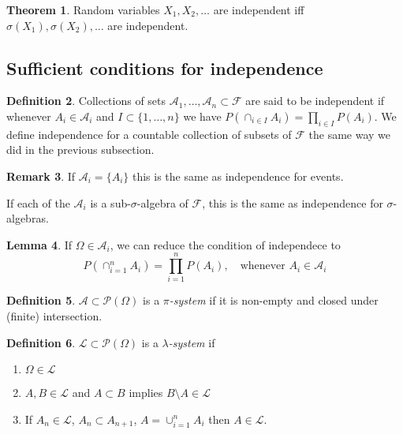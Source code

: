 \documentclass{article}
\theoremstyle{definition}
\newtheorem{theorem}{Theorem}[section]
\newtheorem{lemma}[theorem]{Lemma}
\newtheorem{definition}[theorem]{Definition}
\newtheorem{remark}[theorem]{Remark}
\begin{document}
\begin{theorem}
    Random variables $X_1, X_2, \dots$ are independent iff $\sigma(X_1), \sigma(X_2), \dots$ are independent.
\end{theorem}

\subsection{Sufficient conditions for independence}

\begin{definition}

    Collections of sets $\mathcal{A}_1, \dots, \mathcal{A}_n \subset \mathcal{F}$ are said to be independent if whenever $A_i \in \mathcal{A}_i$ and $I \subset \{1, \dots, n\}$ we have $P(\cap_{i \in I} A_i) = \prod_{i \in I} P(A_i)$. We define independence for a countable collection of subsets of $\mathcal{F}$ the same way we did in the previous subsection.
\end{definition}

\begin{remark}
    If $\mathcal{A}_i = \{A_i\}$ this is the same as independence for events.

    If each of the $\mathcal{A}_i$ is a sub-$\sigma$-algebra of $\mathcal{F}$, this is the same as independence for $\sigma$-algebras.
\end{remark}

\begin{lemma}
    If $\Omega \in \mathcal{A}_i$, we can reduce the condition of independece to
    $$ P(\cap_{i=1}^n A_i) = \prod\limits_{i=1}^n P(A_i), \quad \text{whenever } A_i \in \mathcal{A}_i$$
\end{lemma}

\begin{definition}
    $\mathcal{A} \subset \mathcal{P}(\Omega)$ is a $\pi$\emph{-system} if it is non-empty and closed under (finite) intersection.
\end{definition}

\begin{definition}
    $\mathcal{L} \subset \mathcal{P}(\Omega)$ is a $\lambda$\emph{-system} if
    \begin{enumerate}
        \item $\Omega \in \mathcal{L}$
        \item $A, B \in \mathcal{L}$ and $A \subset B$ implies $B \setminus A \in \mathcal{L}$
        \item If $A_n \in \mathcal{L}$, $A_n \subset A_{n+1}$, $A = \cup_{i=1}^n A_i$ then $A \in \mathcal{L}$.
    \end{enumerate}
\end{definition}
\end{document}
